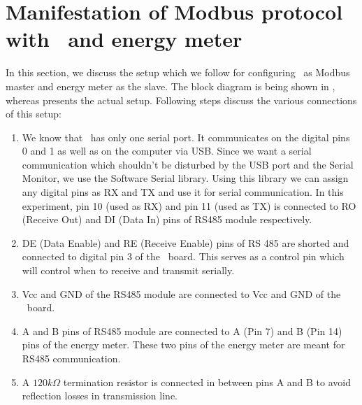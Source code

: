 \section{Manifestation of Modbus protocol with \arduino\ and energy meter}
In this section, we discuss the setup which we follow for configuring 
\arduino\ as Modbus master and energy meter as the slave. 
The block diagram is being shown in  , 
whereas  presents the 
actual setup. Following steps discuss the various connections of this setup:  
\begin{enumerate}
  \item We know that \arduino\ has only one serial port. It communicates on
        the digital pins 0 and 1 as well as on the computer via USB. Since
        we want a serial communication which shouldn't be disturbed by the USB
        port and the Serial Monitor, we use the Software Serial
        library. Using this library we can assign any digital pins as RX and
        TX and use it for serial communication. In this experiment, pin 10 (used as RX) and pin
        11 (used as TX) is connected to RO (Receive Out) and DI (Data In)
        pins of RS485 module respectively.
  \item DE (Data Enable) and RE (Receive Enable) pins of RS 485 are
        shorted and connected to digital pin 3 of the \arduino\ board. 
        This serves as a control pin which will control when to receive and transmit
        serially.
  \item Vcc and GND of the RS485 module are connected to Vcc and GND of
        the \arduino\ board.
  \item A and B pins of RS485 module are connected to A (Pin 7) and B (Pin 14)
        pins of the energy meter. These two pins of the energy meter are meant for RS485 communication.
  \item A $120k\Omega$ termination resistor is connected in between
        pins A and B to avoid reflection losses in transmission line.
\end{enumerate}


